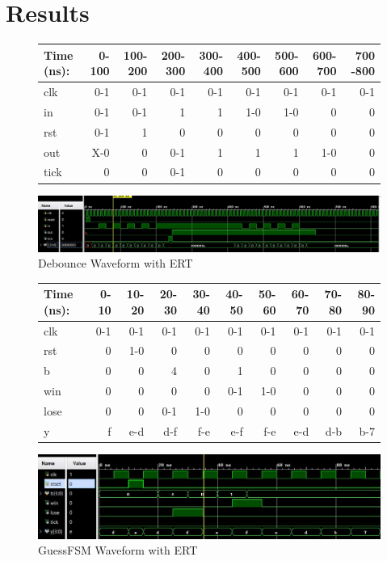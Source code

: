 \documentclass[11pt]{article}
\begin{document}
\section*{Results}

\begin{figure}[ht]\centering
	\begin{tabular}{l|rrrrrrrr}	
		Time (ns): & 0-100 & 100-200 & 200-300 & 300-400 & 400-500 & 500-600 & 600-700 & 700 -800 \\
		\midrule
		clk     & 0-1 & 0-1 & 0-1 & 0-1 & 0-1 & 0-1 & 0-1 & 0-1 \\
		in  	& 0-1 & 0-1 & 1   & 1   & 1-0 & 1-0 & 0   & 0 \\
		rst 	& 0-1 & 1   & 0   & 0   & 0	  & 0   & 0   & 0 \\
		\midrule
		out 	& X-0 & 0   & 0-1 & 1   & 1   & 1   & 1-0 & 0 \\
		tick	& 0   & 0   & 0-1 & 0   & 0   & 0   & 0	  & 0 \\
		\bottomrule
	\end{tabular}
	\bigskip
	\includegraphics[width=1\textwidth,angle=0,origin=c]{bounce2Waveform}
	\caption{Debounce Waveform with ERT}
	\label{fig:sim_with_table}
\end{figure}

\begin{figure}[ht]\centering
	\begin{tabular}{l|rrrrrrrrr}	
		Time (ns): & 0-10 & 10-20 & 20-30 & 30-40 & 40-50 & 50-60 & 60-70 & 70-80 & 80-90\\
		\midrule
		clk     & 0-1 & 0-1 & 0-1 & 0-1 & 0-1 & 0-1 & 0-1 & 0-1 & 0-1 \\
		rst 	& 0   & 1-0 & 0   & 0   & 0	  & 0   & 0   & 0   & 0 \\
		\midrule
		b 		& 0   & 0   & 4   & 0   & 1   & 0   & 0	  & 0   & 0 \\
		win		& 0   & 0   & 0   & 0   & 0-1 & 1-0 & 0   & 0   & 0 \\
		lose 	& 0   & 0   & 0-1 & 1-0 & 0   & 0   & 0   & 0   & 0 \\
		y 		& f   & e-d & d-f & f-e & e-f & f-e & e-d & d-b & b-7 \\
		\bottomrule
	\end{tabular}
	\bigskip
	\includegraphics[width=1\textwidth,angle=0,origin=c]{guessFSMwaveform}
	\caption{GuessFSM Waveform with ERT}
	\label{fig:sim_with_table}
\end{figure}
\end{document}
